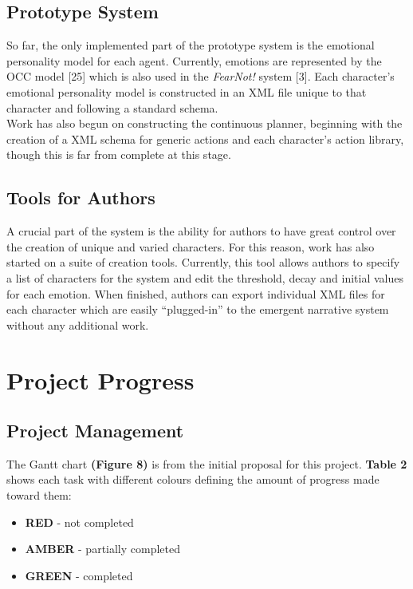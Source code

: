 \documentclass{sig-alternate-05-2015}
\begin{document}
\subsection{Prototype System}

\noindent So far, the only implemented part of the prototype system is the emotional personality model for each agent. Currently, emotions are represented by the OCC model [25] which is also used in the \textit{FearNot!} system [3]. Each character's emotional personality model is constructed in an XML file unique to that character and following a standard schema.\\

Work has also begun on constructing the continuous planner, beginning with the creation of a XML schema for generic actions and each character's action library, though this is far from complete at this stage.

\subsection{Tools for Authors}

\noindent A crucial part of the system is the ability for authors to have great control over the creation of unique and varied characters. For this reason, work has also started on a suite of creation tools. Currently, this tool allows authors to specify a list of characters for the system and edit the threshold, decay and initial values for each emotion. When finished, authors can export individual XML files for each character which are easily ``plugged-in'' to the emergent narrative system without any additional work.

\section{Project Progress}
\subsection{Project Management}

\noindent The Gantt chart \textbf{(Figure 8)} is from the initial proposal for this project. \textbf{Table 2} shows each task with different colours
defining the amount of progress made toward them:
\begin{itemize}
	\item \color{red} \textbf{RED} \color{black} - not completed
	\item \color{orange} \textbf{AMBER} \color{black} - partially completed
	\item \color{green} \textbf{GREEN} \color{black} - completed
\end{itemize}
\end{document}
